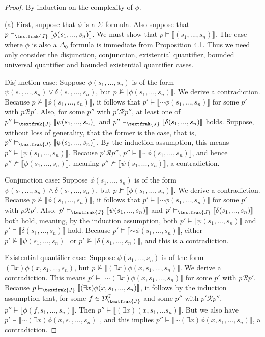 \documentclass{article}
\newcommand*{\oldneg}{\mathord{\sim}}
\newcommand{\lbc}{\llbracket}
\newcommand{\rbc}{\rrbracket}
\theoremstyle{definition}
\begin{document}
\begin{proof}
By induction on the complexity of $\phi$. 

(a) First, suppose that $\phi$ is a $\Sigma$-formula. Also suppose that 
$p\vDash_\textfrak{J}\lbc\phi(s_1,...,s_n)\rbc$. We must show that $p\vDash\lbc(s_1,...,s_n)\rbc$.
The case where $\phi$ is also a $\Delta_0$ formula is immediate 
from Proposition 4.1. Thus we need only consider the disjunction, conjunction, existential quantifier, 
bounded universal quantifier and bounded existential quantifier cases. 

Disjunction case: Suppose $\phi(s_1,...,s_n)$ is of the form $\psi(s_1,...,s_n)\vee\delta(s_1,...,s_n)$, but
$p\nvDash\lbc\phi(s_1,...,s_n)\rbc$. We derive a contradiction. Because 
$p\nvDash\lbc\phi(s_1,...,s_n)\rbc$, it follows that 
$p'\vDash\lbc\oldneg\phi(s_1,...,s_n)\rbc$ for some $p'$ with $p\mathcal{R}p'$. Also, for 
some $p''$ with $p'\mathcal{R}p''$, at least one of $p''\vDash_\textfrak{J}\lbc\psi(s_1,...,s_n)\rbc$ and 
$p''\vDash_\textfrak{J}\lbc\delta(s_1,...,s_n)\rbc$ holds. Suppose, without loss of generality, that the former is the case, that is, 
$p''\vDash_\textfrak{J}\lbc\psi(s_1,...,s_n)\rbc$. By the induction assumption, this means 
$p''\vDash\lbc\psi(s_1,...,s_n)\rbc$. Because $p'\mathcal{R}p''$, $p''\vDash\lbc\oldneg\phi(s_1,...,s_n)\rbc$, 
and hence $p''\nvDash\lbc\phi(s_1,...,s_n)\rbc$, meaning $p''\nvDash\lbc\psi(s_1,...,s_n)\rbc$, a contradiction.

Conjunction case: Suppose $\phi(s_1,...,s_n)$ is of the form $\psi(s_1,...,s_n)\wedge\delta(s_1,...,s_n)$, but
$p\nvDash\lbc\phi(s_1,...,s_n)\rbc$. We derive a contradiction. Because
$p\nvDash\lbc\phi(s_1,...,s_n)\rbc$, it follows that 
$p'\vDash\lbc\oldneg\phi(s_1,...,s_n)\rbc$ for some $p'$ with $p\mathcal{R}p'$. Also,
$p'\vDash_\textfrak{J}\lbc\psi(s_1,...,s_n)\rbc$ and 
$p'\vDash_\textfrak{J}\lbc\delta(s_1,...,s_n)\rbc$ both hold, meaning, by the induction assumption, 
both $p'\vDash\lbc\psi(s_1,...,s_n)\rbc$ and 
$p'\vDash\lbc\delta(s_1,...,s_n)\rbc$ hold. Because 
$p'\vDash\lbc\oldneg\phi(s_1,...,s_n)\rbc$, either 
$p'\nvDash\lbc\psi(s_1,...,s_n)\rbc$ or $p'\nvDash\lbc\delta(s_1,...,s_n)\rbc$, and this is a contradiction.

Existential quantifier case: Suppose $\phi(s_1,...,s_n)$ is of the form 
$(\exists x)\phi(x,s_1,...,s_n)$, but $p\nvDash\lbc(\exists x)\phi(x,s_1,...,s_n)\rbc$. We derive a contradiction. 
This means $p'\vDash\lbc\oldneg(\exists x)\phi(x,s_1,...,s_n)\rbc$ for some $p'$ with $p\mathcal{R}p'$. Because 
$p\vDash_\textfrak{J}\lbc(\exists x)\phi(x,s_1,...,s_n)\rbc$, it follows by the induction assumption that, for some 
$f\in\mathcal{D}^\mathcal{G}_\textfrak{J}$ and some $p''$ with $p'\mathcal{R}p''$,
$p''\vDash\lbc\phi(f,s_1,...,s_n)\rbc$. Then $p''\vDash\lbc(\exists x)(x,s_1,...s_n)\rbc$. But 
we also have $p'\vDash\lbc\oldneg(\exists x)\phi(x,s_1,...,s_n)\rbc$, and this implies
$p''\vDash\lbc\oldneg(\exists x)\phi(x,s_1,...,s_n)\rbc$, a contradiction.


\end{proof}
\end{document}
